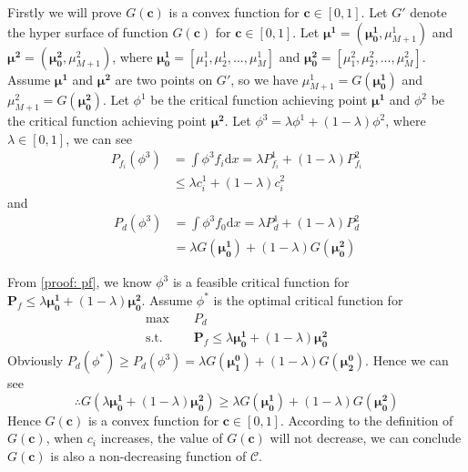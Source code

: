 \documentclass[12pt,journal,a4paper,twoside,onecolumn]{IEEEtran}
\begin{document}
\begin{spacing}{2.5}
Firstly we will prove $G(\mathbf{c})$ is a convex function for $\mathbf{c} \in [0, 1]$.
Let $G'$ denote the hyper surface of function $G(\mathbf{c})$ for $\mathbf{c} \in [0,1]$. Let $\mathbf{\mu^1} = (\mathbf{\mu^1_0}, \mu_{M+1}^1)$ and  $\mathbf{\mu^2} = (\mathbf{\mu^2_0}, \mu_{M+1}^2)$, where $\mathbf{\mu_0^1} = [\mu_1^1, \mu_2^1, ..., \mu_M^1]$ and $\mathbf{\mu_0^2} = [\mu_1^2, \mu_2^2, ..., \mu_M^2]$. Assume $\mathbf{\mu^1}$ and $\mathbf{\mu^2}$ are two points on $G'$, so we have $\mu_{M+1}^1 = G(\mathbf{\mu_0^1})$ and $\mu_{M+1}^2 = G(\mathbf{\mu_0^2})$. Let $\phi^1$  be the critical function achieving point $\mathbf{\mu^1}$ and $\phi^2$ be the critical function achieving point $\mathbf{\mu^2}$. Let $\phi^3 = \lambda \phi^1 + (1 - \lambda)\phi^2$, where $\lambda \in [0, 1]$, we can see
\begin{equation}
\begin{split}
\label{proof: pf}
P_{f_i}(\phi^3) &= \int \phi^3 f_i \mathrm{d}x = \lambda P_{f_i}^1 + (1 - \lambda)P_{f_i}^2\\
&\leq \lambda c_i^1 + (1-\lambda) c_i^2
\end{split}
\end{equation}
and 
\begin{equation}
\begin{split}
\label{proof: pd}
P_d(\phi^3) &= \int \phi^3 f_0 \mathrm{d}x = \lambda P_{d}^1 + (1 - \lambda)P_{d}^2\\
&= \lambda G(\mathbf{\mu^1_0}) + (1-\lambda)G(\mathbf{\mu_0^2})
\end{split}
\end{equation}

From \eqref{proof: pf}, we know $\phi^3$ is a feasible critical function for $\mathbf{P}_f \leq \lambda\mathbf{\mu^1_0} + (1-\lambda)\mathbf{\mu^2_0}$. Assume $\phi^\ast$ is the optimal critical function for 
\begin{equation}
\begin{split}
\label{object}
\max\;\;\;\;&P_d\\
\text{s.t.}\;\;\;\;&\mathbf{P}_f \leq \lambda\mathbf{\mu^1_0} + (1-\lambda)\mathbf{\mu^2_0}
\end{split}
\end{equation}
Obviously $P_d(\phi^\ast) \geq P_d(\phi^3) = \lambda G(\mathbf{\mu_1^0}) + (1-\lambda)G(\mathbf{\mu_2^0})$. Hence we can see
\[
\therefore G(\lambda\mathbf{\mu^1_0}+(1-\lambda)\mathbf{\mu^2_0}) \geq \lambda G(\mathbf{\mu^1_0}) + (1-\lambda)G(\mathbf{\mu^2_0})
\]
Hence $G(\mathbf{c})$ is a convex function for $\mathbf{c} \in [0, 1]$.
According to the definition of $G(\mathbf{c})$, when $c_i$ increases, the value of $G(\mathbf{c})$ will not decrease, we can conclude $G(\mathbf{c})$ is also a non-decreasing function of $\mathcal{C}$. 


\end{spacing}
\end{document}
